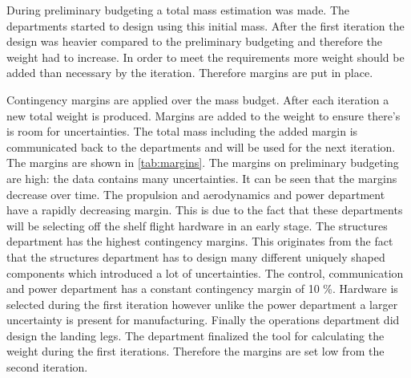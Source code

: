 During preliminary budgeting a total mass estimation was made. The departments started to design using this initial mass. After the first iteration the design was heavier compared to the preliminary budgeting and therefore the weight had to increase. In order to meet the requirements more weight should be added than necessary by the iteration. Therefore margins are put in place.

Contingency margins are applied over the mass budget. After each iteration a new total weight is produced. Margins are added to the weight to ensure there's is room for uncertainties. The total mass including the added margin is communicated back to the departments and will be used for the next iteration. The margins are shown in \autoref{tab:margins}. The margins on preliminary budgeting are high: the data contains many uncertainties. It can be seen that the margins decrease over time. The propulsion and aerodynamics and power department have a rapidly decreasing margin. This is due to the fact that these departments will be selecting off the shelf flight hardware in an early stage. The structures department has the highest contingency margins. This originates from the fact that the structures department has to design many different uniquely shaped components which introduced a lot of uncertainties. The control, communication and power department has a constant contingency margin of 10 \%. Hardware is selected during the first iteration however unlike the power department a larger uncertainty is present for manufacturing. Finally the operations department did design the landing legs. The department finalized the tool for calculating the weight during the first iterations. Therefore the margins are set low from the second iteration.


